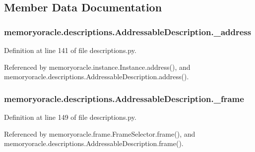 \subsection{Member Data Documentation}
\hypertarget{classmemoryoracle_1_1descriptions_1_1AddressableDescription_a2629ea28eb8de674ac1c22d1ed85c640}{}
\subsubsection[{\+\_\+address}]{\setlength{\rightskip}{0pt plus 5cm}memoryoracle.\+descriptions.\+Addressable\+Description.\+\_\+address\hspace{0.3cm}{\ttfamily [private]}}\label{classmemoryoracle_1_1descriptions_1_1AddressableDescription_a2629ea28eb8de674ac1c22d1ed85c640}


Definition at line 141 of file descriptions.\+py.



Referenced by memoryoracle.\+instance.\+Instance.\+address(), and memoryoracle.\+descriptions.\+Addressable\+Description.\+address().

\hypertarget{classmemoryoracle_1_1descriptions_1_1AddressableDescription_a46200a5bb0d40546f0414821b1bc2a7c}{}
\subsubsection[{\+\_\+frame}]{\setlength{\rightskip}{0pt plus 5cm}memoryoracle.\+descriptions.\+Addressable\+Description.\+\_\+frame\hspace{0.3cm}{\ttfamily [private]}}\label{classmemoryoracle_1_1descriptions_1_1AddressableDescription_a46200a5bb0d40546f0414821b1bc2a7c}


Definition at line 149 of file descriptions.\+py.



Referenced by memoryoracle.\+frame.\+Frame\+Selector.\+frame(), and memoryoracle.\+descriptions.\+Addressable\+Description.\+frame().


